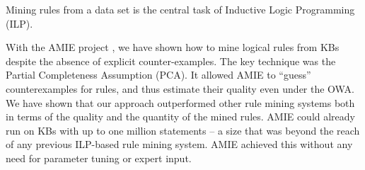 Mining rules from a data set is the central task of Inductive Logic Programming (ILP).


With the AMIE project \cite{amie}, we have shown how to mine logical rules from KBs despite the absence of explicit counter-examples.
The key technique was the Partial Completeness Assumption (PCA). It
allowed AMIE to ``guess'' counterexamples for rules, and thus estimate their quality even under the OWA.
We have shown that our approach outperformed other rule mining systems %
both in terms of the quality and the quantity of the mined rules.
AMIE could already run on KBs with up to one million statements -- a size that was beyond the reach of any previous ILP-based rule mining system.
AMIE achieved this without any need for parameter tuning or expert input.

